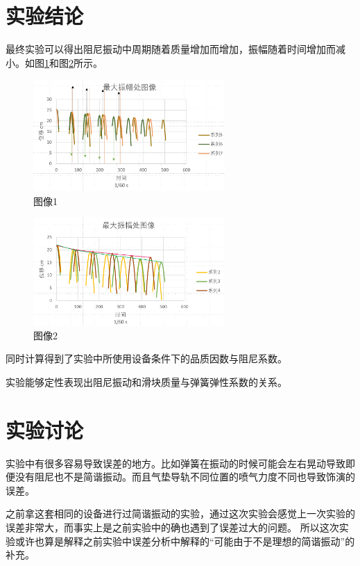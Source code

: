 \documentclass{ctexart}
\begin{document}
\section{实验结论}
  最终实验可以得出阻尼振动中周期随着质量增加而增加，振幅随着时间增加而减小。如图\ref{tuxiang1}和图\ref{tuxiang2}所示。
  \begin{figure}[H]
    \centering 
    \includegraphics[width=0.65\textwidth,height=0.35\textheight]{tuxaing1.png}
    \caption{图像1}
    \label{tuxiang1}
  \end{figure}

  \begin{figure}[H]
    \centering 
    \includegraphics[width=0.65\textwidth,height=0.35\textheight]{tuxiang2.png}
    \caption{图像2}
    \label{tuxiang2}
  \end{figure}

  同时计算得到了实验中所使用设备条件下的品质因数与阻尼系数。

  实验能够定性表现出阻尼振动和滑块质量与弹簧弹性系数的关系。

\section{实验讨论}
  实验中有很多容易导致误差的地方。比如弹簧在振动的时候可能会左右晃动导致即便没有阻尼也不是简谐振动。而且气垫导轨不同位置的喷气力度不同也导致饰演的误差。

  之前拿这套相同的设备进行过简谐振动的实验，通过这次实验会感觉上一次实验的误差非常大，而事实上是之前实验中的确也遇到了误差过大的问题。
  所以这次实验或许也算是解释之前实验中误差分析中解释的“可能由于不是理想的简谐振动”的补充。
  
\end{document}

